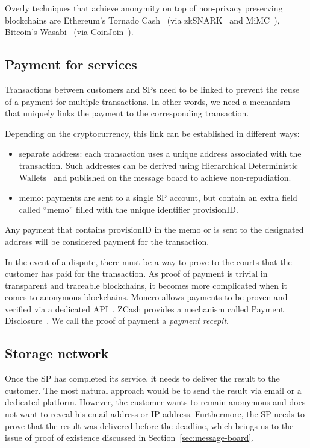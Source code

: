 \documentclass[pdftex,twocolumn,epjc3]{svjour3}
\begin{document}
{Overly techniques that achieve anonymity on top of non-privacy preserving blockchains are Ethereum's Tornado Cash~\cite{pertsevTornadoCashPrivacy2019} (via zkSNARK~\cite{grothSizePairingbasedNoninteractive2016} and MiMC~\cite{albrechtMiMCEfficientEncryption2016}), Bitcoin's Wasabi~\cite{wasabiwalletBitcoinPrivacyWallet} (via CoinJoin~\cite{maxwellCoinJoinBitcoinPrivacy2013}).

\subsection{Payment for services}\label{payment-for-services}
Transactions between customers and SPs need to be linked to prevent the reuse of a payment for multiple transactions. In other words, we need a mechanism that uniquely links the payment to the corresponding transaction.

Depending on the cryptocurrency, this link can be established in different ways:

\begin{itemize}
\item separate address: each transaction uses a unique address associated with the transaction. Such addresses can be derived using Hierarchical Deterministic Wallets~\cite{wuilleBIP32HierarchicalDeterministic2012} and published on the message board to achieve non-repudiation.
\item memo: payments are sent to a single SP account, but contain an extra field called ``memo'' filled with the unique identifier $\textrm{provisionID}$. 
\end{itemize}

Any payment that contains $\textrm{provisionID}$ in the memo or is sent to the designated address will be considered payment for the transaction. 

In the event of a dispute, there must be a way to prove to the courts that the customer has paid for the transaction. As proof of payment is trivial in transparent and traceable blockchains, it becomes more complicated when it comes to anonymous blockchains. Monero allows payments to be proven and verified via a dedicated API~\cite{moneroHowProvePayment}. ZCash provides a mechanism called Payment Disclosure~\cite{daviesIntroductionPaymentDisclosure2017}. We call the proof of payment a \textit{payment recepit}.

\subsection{Storage network}\label{storage-network}
Once the SP has completed its service, it needs to deliver the result to the customer. The most natural approach would be to send the result via email or a dedicated platform. However, the customer wants to remain anonymous and does not want to reveal his email address or IP address. Furthermore, the SP needs to prove that the result was delivered before the deadline, which brings us to the issue of proof of existence discussed in Section~\ref{sec:message-board}.

}
\end{document}

